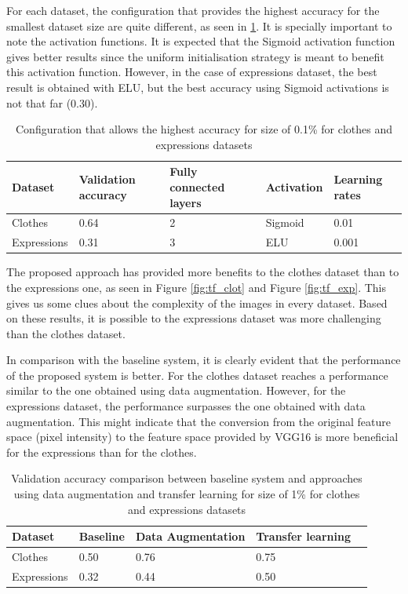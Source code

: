 \documentclass{article}
\begin{document}
For each dataset, the configuration that provides the highest accuracy for the smallest dataset size are quite different, as seen in \ref{tab:tf_1}. It is specially important to note the activation functions. It is expected that the Sigmoid activation function gives better results since the uniform initialisation strategy is meant to benefit this activation function. However, in the case of expressions dataset, the best result is obtained with ELU, but the best accuracy using Sigmoid activations is not that far (0.30).

\begin{table}[!htb]
  \centering
  \begin{tabular}{| l | l | l | l | l |}
    \hline
    \textbf{Dataset} & \textbf{Validation accuracy} & \textbf{Fully connected layers}& \textbf{Activation} & \textbf{Learning rates}\\ \hline
    Clothes & 0.64 & 2 & Sigmoid & 0.01 \\ \hline
    Expressions & 0.31  & 3 & ELU & 0.001 \\ \hline
  \end{tabular}
  \caption{Configuration that allows the highest accuracy for size of 0.1\% for clothes and expressions datasets}
  \label{tab:tf_1}
\end{table}

The proposed approach has provided more benefits to the clothes dataset than to the expressions one, as seen in Figure \ref{fig:tf_clot} and Figure \ref{fig:tf_exp}. This gives us some clues about the complexity of the images in every dataset. Based on these results, it is possible to the expressions dataset was more challenging than the clothes dataset. 

In comparison with the baseline system, it is clearly evident that the performance of the proposed system is better. For the clothes dataset reaches a performance similar to the one obtained using data augmentation. However, for the expressions dataset, the performance surpasses the one obtained with data augmentation. This might indicate that the conversion from the original feature space (pixel intensity) to the feature space provided by VGG16 is more beneficial for the expressions than for the clothes.

\begin{table}[!htb]
  \centering
  \begin{tabular}{| l | l | l | l | l |}
    \hline
    \textbf{Dataset} & \textbf{Baseline} & \textbf{Data Augmentation}& \textbf{Transfer learning} \\ \hline
    Clothes & 0.50 & 0.76 & 0.75 \\ \hline
    Expressions & 0.32  & 0.44 & 0.50 \\ \hline
  \end{tabular}
  \caption{Validation accuracy comparison between baseline system and approaches using data augmentation and transfer learning for size of 1\% for clothes and expressions datasets}
  \label{tab:tf_2}
\end{table}
\end{document}
